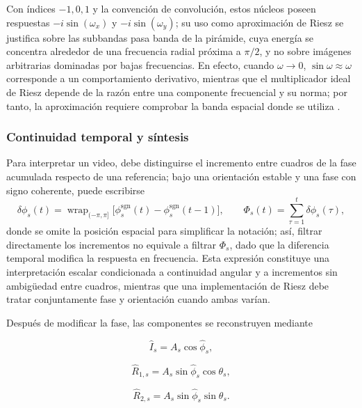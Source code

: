 Con índices $-1,0,1$ y la convención de convolución, estos núcleos poseen respuestas $-i\sin(\omega_x)$ y $-i\sin(\omega_y)$; su uso como aproximación de Riesz se justifica sobre las subbandas pasa banda de la pirámide, cuya energía se concentra alrededor de una frecuencia radial próxima a $\pi/2$, y no sobre imágenes arbitrarias dominadas por bajas frecuencias. En efecto, cuando $\omega\to0$, $\sin\omega\approx\omega$ corresponde a un comportamiento derivativo, mientras que el multiplicador ideal de Riesz depende de la razón entre una componente frecuencial y su norma; por tanto, la aproximación requiere comprobar la banda espacial donde se utiliza \cite{wadhwa2014riesz}.

\subsubsection{Continuidad temporal y síntesis}

Para interpretar un video, debe distinguirse el incremento entre cuadros de la fase acumulada respecto de una referencia; bajo una orientación estable y una fase con signo coherente, puede escribirse
\begin{equation}
 \delta\phi_s(t)=\operatorname{wrap}_{(-\pi,\pi]}
 \bigl[\phi_s^{\mathrm{sgn}}(t)-\phi_s^{\mathrm{sgn}}(t-1)\bigr],
 \qquad \Phi_s(t)=\sum_{\tau=1}^{t}\delta\phi_s(\tau),
 \label{eq:piramides_incremento_acumulacion}
\end{equation}
donde se omite la posición espacial para simplificar la notación; así, filtrar directamente los incrementos no equivale a filtrar $\Phi_s$, dado que la diferencia temporal modifica la respuesta en frecuencia. Esta expresión constituye una interpretación escalar condicionada a continuidad angular y a incrementos sin ambigüedad entre cuadros, mientras que una implementación de Riesz debe tratar conjuntamente fase y orientación cuando ambas varían.

Después de modificar la fase, las componentes se reconstruyen mediante

\begin{equation}
    \widehat{I}_s
    =
    A_s\cos\widehat{\phi}_s,
    \label{eq:reconstruccion_subbanda_riesz}
\end{equation}

\begin{equation}
    \widehat{R}_{1,s}
    =
    A_s
    \sin\widehat{\phi}_s
    \cos\theta_s,
\end{equation}

\begin{equation}
    \widehat{R}_{2,s}
    =
    A_s
    \sin\widehat{\phi}_s
    \sin\theta_s.
\end{equation}

